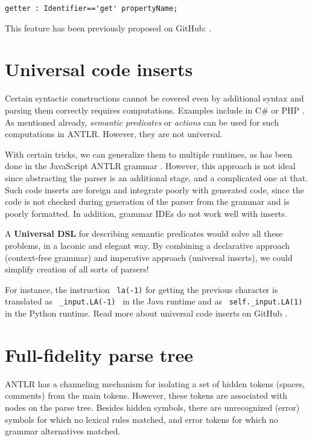 \documentclass[sigplan,screen]{acmart}
\begin{document}
\begin{verbatim}
getter : Identifier=='get' propertyName;
\end{verbatim}

This feature has been previously proposed on GitHub: \cite{token-value-comparison-operator}.

\section{Universal code inserts}

Certain syntactic constructions cannot be covered even by additional
syntax and parsing them correctly requires computations. Examples
include in C\# or PHP \cite{string-interpolation}. As mentioned already, \emph{semantic
predicates} or \emph{actions} can be used for such computations in
ANTLR. However, they are not universal.

With certain tricks, we can generalize them to multiple runtimes, as has
been done in the JavaScript ANTLR grammar \cite{universal-javascript-grammar}.
However, this approach is not ideal since abstracting the
parser is an additional stage, and a complicated one at that. Such code
inserts are foreign and integrate poorly with generated code, since the
code is not checked during generation of the parser from the grammar and
is poorly formatted. In addition, grammar IDEs do not work well with
inserts.

A \textbf{Universal DSL} for describing semantic predicates would solve
all these problems, in a laconic and elegant way. By combining a
declarative approach (context-free grammar) and imperative approach
(universal inserts), we could simplify creation of all sorts of parsers!

For instance, the instruction ~\texttt{la(-1)} for getting the previous
character is translated as ~\texttt{\_input.LA(-1)}~ in the Java runtime
and as ~\texttt{self.\_input.LA(1)}~ in the Python runtime. Read more
about universal code inserts on GitHub \cite{universal-code-inserts}.

\section{Full-fidelity parse tree}

ANTLR has a channeling mechanism for isolating a set of hidden tokens
(spaces, comments) from the main tokens. However, these tokens are
associated with nodes on the parse tree. Besides hidden symbols, there
are unrecognized (error) symbols for which no lexical rules matched, and
error tokens for which no grammar alternatives matched.
\end{document}
